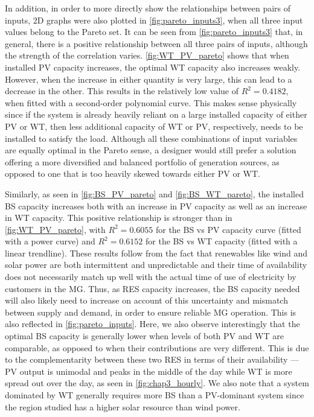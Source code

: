 \documentclass[final,3p,times]{elsarticle}
\begin{document}
In addition, in order to more directly show the relationships between pairs of inputs, 2D graphs were also plotted in \cref{fig:pareto_inputs3}, when all three input values belong to the Pareto set. It can be seen from \cref{fig:pareto_inputs3} that, in general, there is a positive relationship between all three pairs of inputs, although the strength of the correlation varies. \cref{fig:WT_PV_pareto} shows that when installed PV capacity increases, the optimal WT capacity also increases weakly. However, when the increase in either quantity is very large, this can lead to a decrease in the other. This results in the relatively low value of $R^2 = 0.4182$, when fitted with a second-order polynomial curve. This makes sense physically since if the system is already heavily reliant on a large installed capacity of either PV or WT, then less additional capacity of WT or PV, respectively, needs to be installed to satisfy the load. Although all these combinations of input variables are equally optimal in the Pareto sense, a designer would still prefer a solution offering a more diversified and balanced portfolio of generation sources, as opposed to one that is too heavily skewed towards either PV or WT. 

Similarly, as seen in \cref{fig:BS_PV_pareto} and \cref{fig:BS_WT_pareto}, the installed BS capacity increases both with an increase in PV capacity as well as an increase in WT capacity. This positive relationship is stronger than in \cref{fig:WT_PV_pareto}, with $R^2 = 0.6055$ for the BS vs PV capacity curve (fitted with a power curve) and $R^2 = 0.6152$ for the BS vs WT capacity (fitted with a linear trendline). These results follow from the fact that renewables like wind and solar power are both intermittent and unpredictable and their time of availability does not necessarily match up well with the actual time of use of electricity by customers in the MG. Thus, as RES capacity increases, the BS capacity needed will also likely need to increase on account of this uncertainty and mismatch between supply and demand, in order to ensure reliable MG operation. This is also reflected in \cref{fig:pareto_inputs}. Here, we also observe interestingly that the optimal BS capacity is generally lower when levels of both PV and WT are comparable, as opposed to when their contributions are very different. This is due to the complementarity between these two RES in terms of their availability --- PV output is unimodal and peaks in the middle of the day while WT is more spread out over the day, as seen in \cref{fig:chap3_hourly}. We also note that a system dominated by WT generally requires more BS than a PV-dominant system since the region studied has a higher solar resource than wind power.
\end{document}
